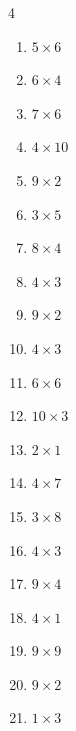 \begin{multicols}{4}
\begin{enumerate}
  \item $5\times 6$
        \phantom{$=30$}

  \item $6\times 4$
        \phantom{$=24$}

  \item $7\times 6$
        \phantom{$=42$}

  \item $4\times 10$
        \phantom{$=40$}

  \item $9\times 2$
        \phantom{$=18$}

  \item $3\times 5$
        \phantom{$=15$}

  \item $8\times 4$
        \phantom{$=32$}

  \item $4\times 3$
        \phantom{$=12$}

  \item $9\times 2$
        \phantom{$=18$}

  \item $4\times 3$
        \phantom{$=12$}

  \item $6\times 6$
        \phantom{$=36$}

  \item $10\times 3$
        \phantom{$=30$}

  \item $2\times 1$
        \phantom{$=2$}

  \item $4\times 7$
        \phantom{$=28$}

  \item $3\times 8$
        \phantom{$=24$}

  \item $4\times 3$
        \phantom{$=12$}

  \item $9\times 4$
        \phantom{$=36$}

\columnbreak %

  \item $4\times 1$
        \phantom{$=4$}

  \item $9\times 9$
        \phantom{$=81$}

  \item $9\times 2$
        \phantom{$=18$}

  \item $1\times 3$
        \phantom{$=3$}


\end{enumerate}
\end{multicols}
